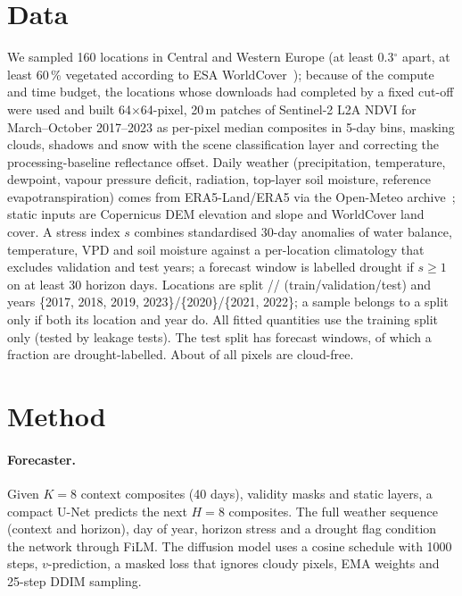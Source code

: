 \documentclass[10pt]{article}
\begin{document}
\section{Data}
We sampled 160 locations in Central and Western Europe (at least 0.3$^\circ$ apart, at least 60\,\% vegetated
according to ESA WorldCover~\cite{zanaga2022worldcover}); because of the compute and time budget, the 
locations whose downloads had completed by a fixed cut-off were used and built 64$\times$64-pixel, 20\,m patches of Sentinel-2
L2A NDVI for March--October 2017--2023 as per-pixel median composites in 5-day bins, masking clouds, shadows and snow
with the scene classification layer and correcting the processing-baseline reflectance offset. Daily weather
(precipitation, temperature, dewpoint, vapour pressure deficit, radiation, top-layer soil moisture, reference
evapotranspiration) comes from ERA5-Land/ERA5 via the Open-Meteo archive~\cite{zippenfenig2023openmeteo}; static inputs
are Copernicus DEM elevation and slope and WorldCover land cover. A stress index $s$ combines standardised 30-day
anomalies of water balance, temperature, VPD and soil moisture against a per-location climatology that excludes
validation and test years; a forecast window is labelled drought if $s\ge 1$ on at least 30 horizon days.
Locations are split // (train/validation/test) and years
\{2017, 2018, 2019, 2023\}/\{2020\}/\{2021, 2022\}; a sample belongs to a split only if both its location and year
do. All fitted quantities use the training split only (tested by leakage tests). The test split has 
forecast windows, of which a fraction  are drought-labelled. About  of all pixels are
cloud-free.

\section{Method}
\paragraph{Forecaster.} Given $K{=}8$ context composites (40 days), validity masks and static layers, a compact U-Net
predicts the next $H{=}8$ composites. The full weather sequence (context and horizon), day of year, horizon stress and
a drought flag condition the network through FiLM. The diffusion model uses a cosine schedule with 1000 steps,
$v$-prediction, a masked loss that ignores cloudy pixels, EMA weights and 25-step DDIM sampling.
\end{document}
